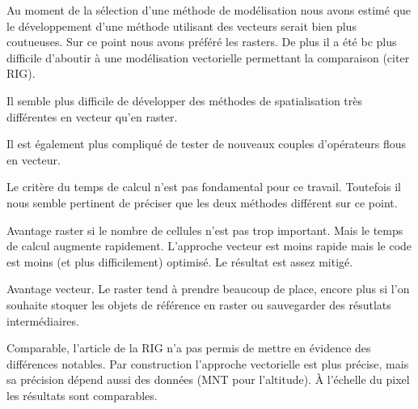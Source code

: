 
Au moment de la sélection d'une méthode de modélisation nous avons
estimé que le développement d'une méthode utilisant des vecteurs
serait bien plus coutueuses. Sur ce point nous avons préféré les
rasters. De plus il a été bc plus difficile d'aboutir à une
modélisation vectorielle permettant la comparaison (citer RIG).


Il semble plus difficile de développer des méthodes de spatialisation
très différentes en vecteur qu'en raster.

Il est également plus compliqué de tester de nouveaux couples
d'opérateurs flous en vecteur.



Le critère du temps de calcul n'est pas fondamental pour ce
travail. Toutefois il nous semble pertinent de préciser que les deux
méthodes différent sur ce point.

Avantage raster si le nombre de cellules n'est pas trop
important. Mais le temps de calcul augmente rapidement. L'approche
vecteur est moins rapide mais le code est moins (et plus
difficilement) optimisé. Le résultat est assez mitigé.


Avantage vecteur. Le raster tend à prendre beaucoup de place, encore
plus si l'on souhaite stoquer les objets de référence en raster ou
sauvegarder des résutlats intermédiaires.


Comparable, l'article de la RIG n'a pas permis de mettre en évidence
des différences notables. Par construction l'approche vectorielle est
plus précise, mais sa précision dépend aussi des données (MNT pour
l'altitude). À l'échelle du pixel les résultats sont comparables.



